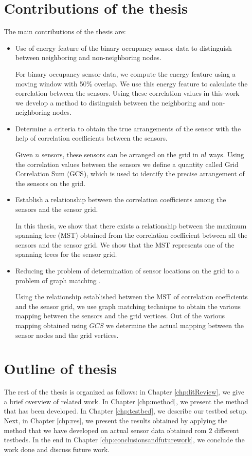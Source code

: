 \section{Contributions of the thesis}
The main contributions of the thesis are:
\begin{itemize}
\item Use of energy feature of the binary occupancy sensor data to distinguish between neighboring and non-neighboring nodes.\par
For binary occupancy sensor data, we compute the energy feature using a moving window with 50\% overlap. 
We use this energy feature to calculate the correlation between the sensors.
 Using these correlation values in this work we develop a method to distinguish between the neighboring and non-neighboring nodes.
\item Determine a criteria to obtain the true arrangements of the sensor with the help of correlation coefficients between the sensors.\par
Given $n$ sensors, these sensors can be arranged on the grid in $n!$ ways. Using the correlation values between the sensors we define a quantity called Grid Correlation Sum (GCS), which is used to identify the precise arrangement of the sensors on the grid.
\item Establish a relationship between the correlation coefficients among the sensors and the sensor grid.\par
In this thesis, we show that there exists a relationship between the maximum spanning tree (MST) obtained from the correlation coefficient between all the sensors and the sensor grid. We show that the MST represents one of the spanning trees for the sensor grid.
\item Reducing the problem of determination of sensor locations  on the grid to a problem of graph matching \cite{conte2004thirty}.\par
 Using the relationship established between the MST of correlation coefficients and the sensor grid, we use graph matching technique to obtain the various mapping between the sensors and the grid vertices. Out of the various mapping obtained using $GCS$ we determine the actual mapping  between the sensor nodes and the grid vertices.
\end{itemize}

\section{Outline of thesis}

The rest of the thesis is organized as follows: in Chapter \ref{chp:litReview}, we give a brief overview of related work. In Chapter \ref{chp:method}, we present the method that has been developed. In Chapter \ref{chp:testbed}, we describe our testbed setup. Next, in Chapter \ref{chp:res}, we present the results obtained by applying the method that we have developed on actual sensor data obtained rom 2 different testbeds. In the end in Chapter \ref{chp:conclusionsandfuturework}, we conclude the work done and discuss future work.




